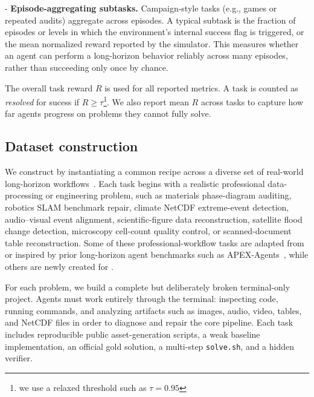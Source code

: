 - \textbf{Episode-aggregating subtasks.}
  Campaign‑style tasks (e.g., games or repeated audits) aggregate across episodes.
  A typical subtask is the fraction of episodes or levels in which the environment’s internal success flag is triggered, or the mean normalized reward reported by the simulator.
  This measures whether an agent can perform a long-horizon behavior reliably across many episodes, rather than succeeding only once by chance.

The overall task reward $R$ is used for all reported metrics.
A task is counted as \emph{resolved} for sucess if $R \geq \tau$\footnote{we use a relaxed threshold such as $\tau = 0.95$}.
%
We also report mean $R$ across tasks to capture how far agents progress on problems they cannot fully solve.



\subsection{Dataset construction}

We construct \ours{} by instantiating a common recipe across a diverse set of real-world long-horizon workflows~\cite{vidgen2026apex, wu2026co}.
Each task begins with a realistic professional data-processing or engineering problem, such as materials phase-diagram auditing, robotics SLAM benchmark repair, climate NetCDF extreme-event detection, audio--visual event alignment, scientific-figure data reconstruction, satellite flood change detection, microscopy cell-count quality control, or scanned-document table reconstruction.
Some of these professional-workflow tasks are adapted from or inspired by prior long-horizon agent benchmarks such as APEX-Agents~\cite{vidgen2026apex}, while others are newly created for \ours{}.

For each problem, we build a complete but deliberately broken terminal-only project.
Agents must work entirely through the terminal: inspecting code, running commands, and analyzing artifacts such as images, audio, video, tables, and NetCDF files in order to diagnose and repair the core pipeline.
Each task includes reproducible public asset-generation scripts, a weak baseline implementation, an official gold solution, a multi-step \texttt{solve.sh}, and a hidden verifier.


